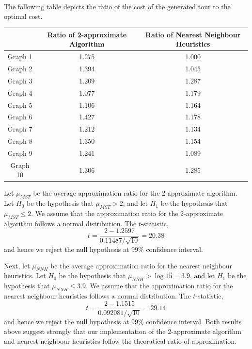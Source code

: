 \documentclass[paper=a4, fontsize=11pt]{scrartcl}	%
\numberwithin{equation}{section}		%
\numberwithin{figure}{section}			%
\numberwithin{table}{section}				%
\begin{document}
The following table depicts the ratio of the cost of the generated tour to the optimal cost.
\begin{center}
\begin{tabular}{|c|c|c|}
\hline 
 & Ratio of 2-approximate Algorithm & Ratio of Nearest Neighbour Heuristics\\ 
\hline 
Graph 1 & 1.275 & 1.000 \\ 
\hline 
Graph 2 & 1.394 & 1.045 \\ 
\hline 
Graph 3 & 1.209 & 1.287 \\ 
\hline 
Graph 4 & 1.077 & 1.179 \\ 
\hline 
Graph 5 & 1.106 & 1.164 \\ 
\hline 
Graph 6 & 1.427 & 1.178 \\ 
\hline 
Graph 7 & 1.212 & 1.134 \\ 
\hline 
Graph 8 & 1.350 & 1.154 \\ 
\hline 
Graph 9 & 1.241 & 1.089 \\ 
\hline 
Graph 10 & 1.306 & 1.285 \\ 
\hline 
\end{tabular} 
\end{center}
Let $\mu_{MST}$ be the average approximation ratio for the 2-approximate algorithm. Let $H_0$ be the hypothesis that $\mu_{MST} > 2$, and let $H_1$ be the hypothesis that $\mu_{MST} \le 2$. We assume that the approximation ratio for the 2-approximate algorithm follows a normal distribution. The $t$-statistic, 
\[t = \frac{2-1.2597}{0.11487/\sqrt{10}} = 20.38\]
and hence we reject the null hypothesis at 99\% confidence interval. 

Next, let $\mu_{NNH}$ be the average approximation ratio for the nearest neighbour heuristics. Let $H_0$ be the hypothesis that $\mu_{NNH} > \log{15} = 3.9$, and let $H_1$ be the hypothesis that $\mu_{NNH} \le 3.9$. We assume that the approximation ratio for the nearest neighbour heuristics follows a normal distribution. The $t$-statistic, 
\[t = \frac{2-1.1515}{0.092081/\sqrt{10}} = 29.14\]
and hence we reject the null hypothesis at 99\% confidence interval. Both results above suggest strongly that our implementation of the 2-approximate algorithm and nearest neighbour heuristics follow the theoratical ratio of approximation. 
\end{document}
